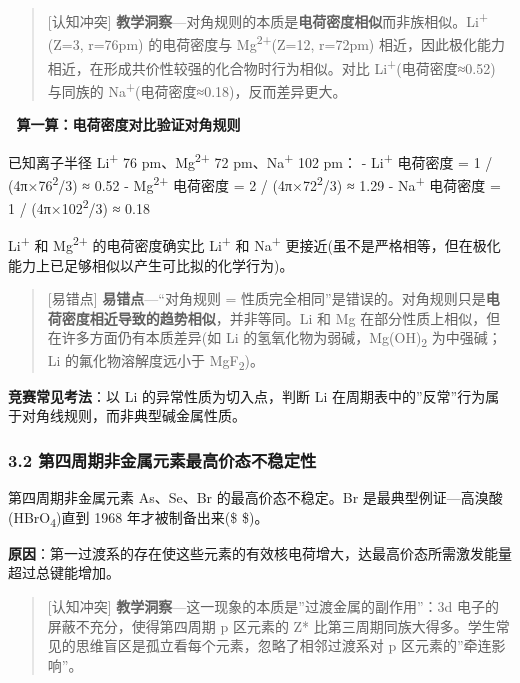 \begin{quote}
{[}认知冲突{]} \textbf{教学洞察}---对角规则的本质是\textbf{电荷密度相似}而非族相似。Li\textsuperscript{+}(Z=3, r=76pm) 的电荷密度与 Mg\textsuperscript{2+}(Z=12, r=72pm) 相近，因此极化能力相近，在形成共价性较强的化合物时行为相似。对比 Li\textsuperscript{+}(电荷密度≈0.52) 与同族的 Na\textsuperscript{+}(电荷密度≈0.18)，反而差异更大。
\end{quote}

📝 \textbf{算一算：电荷密度对比验证对角规则}

已知离子半径 Li\textsuperscript{+} 76 pm、Mg\textsuperscript{2+} 72 pm、Na\textsuperscript{+} 102 pm：
- Li\textsuperscript{+} 电荷密度 = 1 / (4π×76\textsuperscript{2}/3) ≈ 0.52
- Mg\textsuperscript{2+} 电荷密度 = 2 / (4π×72\textsuperscript{2}/3) ≈ 1.29
- Na\textsuperscript{+} 电荷密度 = 1 / (4π×102\textsuperscript{2}/3) ≈ 0.18

Li\textsuperscript{+} 和 Mg\textsuperscript{2+} 的电荷密度确实比 Li\textsuperscript{+} 和 Na\textsuperscript{+} 更接近(虽不是严格相等，但在极化能力上已足够相似以产生可比拟的化学行为)。

\begin{quote}
{[}易错点{]} \textbf{易错点}---``对角规则 = 性质完全相同''是错误的。对角规则只是\textbf{电荷密度相近导致的趋势相似}，并非等同。Li 和 Mg 在部分性质上相似，但在许多方面仍有本质差异(如 Li 的氢氧化物为弱碱，Mg(OH)\textsubscript{2} 为中强碱；Li 的氟化物溶解度远小于 MgF\textsubscript{2})。
\end{quote}

\textbf{竞赛常见考法}：以 Li 的异常性质为切入点，判断 Li 在周期表中的''反常''行为属于对角线规则，而非典型碱金属性质。

\subsubsection{3.2 第四周期非金属元素最高价态不稳定性}\label{ux7b2cux56dbux5468ux671fux975eux91d1ux5c5eux5143ux7d20ux6700ux9ad8ux4ef7ux6001ux4e0dux7a33ux5b9aux6027}

第四周期非金属元素 As、Se、Br 的最高价态不稳定。Br 是最典型例证---高溴酸(HBrO\textsubscript{4})直到 1968 年才被制备出来(\$  \$)。

\textbf{原因}：第一过渡系的存在使这些元素的有效核电荷增大，达最高价态所需激发能量超过总键能增加。

\begin{quote}
{[}认知冲突{]} \textbf{教学洞察}---这一现象的本质是''过渡金属的副作用''：3d 电子的屏蔽不充分，使得第四周期 p 区元素的 Z* 比第三周期同族大得多。学生常见的思维盲区是孤立看每个元素，忽略了相邻过渡系对 p 区元素的''牵连影响''。
\end{quote}

